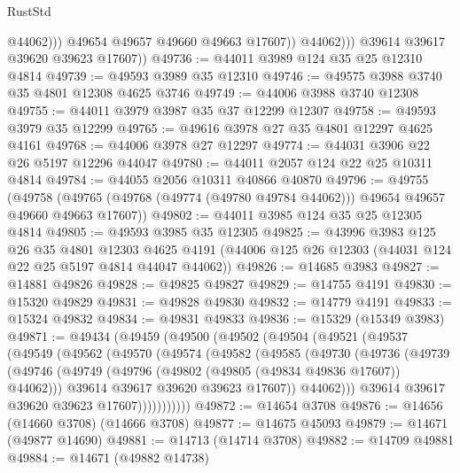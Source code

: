 \begin{lexlean}{RustStd}
\begin{coremodule}
                        @44062)))
                  @49654
                  @49657
                  @49660
                  @49663
                  @17607))
              @44062)))
        @39614
        @39617
        @39620
        @39623
        @17607))
@49736 := @44011 @3989 @124 @35 @25 @12310 @4814
@49739 := @49593 @3989 @35 @12310
@49746 := @49575 @3988 @3740 @35 @4801 @12308 @4625 @3746
@49749 := @44006 @3988 @3740 @12308
@49755 := @44011 @3979 @3987 @35 @37 @12299 @12307
@49758 := @49593 @3979 @35 @12299
@49765 := @49616 @3978 @27 @35 @4801 @12297 @4625 @4161
@49768 := @44006 @3978 @27 @12297
@49774 := @44031 @3906 @22 @26 @5197 @12296 @44047
@49780 := @44011 @2057 @124 @22 @25 @10311 @4814
@49784 := @44055 @2056 @10311 @40866 @40870
@49796 := @49755
    (@49758 (@49765 (@49768 (@49774 (@49780 @49784 @44062))) @49654 @49657 @49660 @49663 @17607))
@49802 := @44011 @3985 @124 @35 @25 @12305 @4814
@49805 := @49593 @3985 @35 @12305
@49825 := @43996
    @3983
    @125
    @26
    @35
    @4801
    @12303
    @4625
    @4191
    (@44006 @125 @26 @12303 (@44031 @124 @22 @25 @5197 @4814 @44047 @44062))
@49826 := @14685 @3983
@49827 := @14881 @49826
@49828 := @49825 @49827
@49829 := @14755 @4191
@49830 := @15320 @49829
@49831 := @49828 @49830
@49832 := @14779 @4191
@49833 := @15324 @49832
@49834 := @49831 @49833
@49836 := @15329 (@15349 @3983)
@49871 := @49434
    (@49459
      (@49500
        (@49502
          (@49504
            (@49521
              (@49537
                (@49549
                  (@49562
                    (@49570
                      (@49574
                        (@49582
                          (@49585
                            (@49730
                              (@49736
                                (@49739
                                  (@49746
                                    (@49749
                                      (@49796 (@49802 (@49805 (@49834 @49836 @17607)) @44062)))
                                    @39614
                                    @39617
                                    @39620
                                    @39623
                                    @17607))
                                @44062)))
                          @39614
                          @39617
                          @39620
                          @39623
                          @17607)))))))))))
@49872 := @14654 @3708
@49876 := @14656 (@14660 @3708) (@14666 @3708)
@49877 := @14675 @45093
@49879 := @14671 (@49877 @14690)
@49881 := @14713 (@14714 @3708)
@49882 := @14709 @49881
@49884 := @14671 (@49882 @14738)

\end{coremodule}
\end{lexlean}
